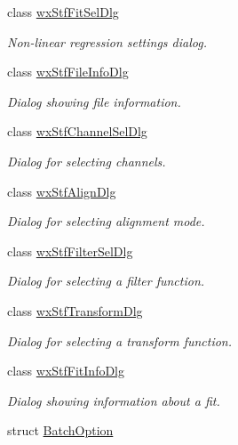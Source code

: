 \begin{DoxyCompactItemize}
class \hyperlink{classwxStfFitSelDlg}{wxStfFitSelDlg}
\begin{DoxyCompactList}\small\item\em Non-\/linear regression settings dialog. \item\end{DoxyCompactList}\item 
class \hyperlink{classwxStfFileInfoDlg}{wxStfFileInfoDlg}
\begin{DoxyCompactList}\small\item\em Dialog showing file information. \item\end{DoxyCompactList}\item 
class \hyperlink{classwxStfChannelSelDlg}{wxStfChannelSelDlg}
\begin{DoxyCompactList}\small\item\em Dialog for selecting channels. \item\end{DoxyCompactList}\item 
class \hyperlink{classwxStfAlignDlg}{wxStfAlignDlg}
\begin{DoxyCompactList}\small\item\em Dialog for selecting alignment mode. \item\end{DoxyCompactList}\item 
class \hyperlink{classwxStfFilterSelDlg}{wxStfFilterSelDlg}
\begin{DoxyCompactList}\small\item\em Dialog for selecting a filter function. \item\end{DoxyCompactList}\item 
class \hyperlink{classwxStfTransformDlg}{wxStfTransformDlg}
\begin{DoxyCompactList}\small\item\em Dialog for selecting a transform function. \item\end{DoxyCompactList}\item 
class \hyperlink{classwxStfFitInfoDlg}{wxStfFitInfoDlg}
\begin{DoxyCompactList}\small\item\em Dialog showing information about a fit. \item\end{DoxyCompactList}\item 
struct \hyperlink{structBatchOption}{BatchOption}

\end{DoxyCompactItemize}
